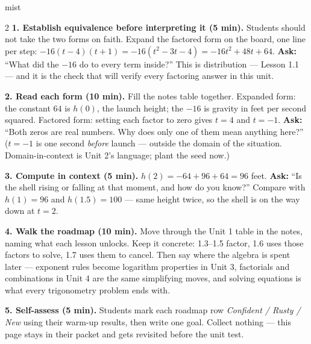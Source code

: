 \documentclass[10pt]{article}
\begin{document}
\boxguard
\begin{skillbox}[Lesson]{mist}
\begin{multicols}{2}
\textbf{1. Establish equivalence before interpreting it (5 min).} Students should not take the
two forms on faith. Expand the factored form on the board, one line per step:
$-16(t-4)(t+1) = -16(t^2-3t-4) = -16t^2+48t+64$. \textbf{Ask:} ``What did the $-16$ do to every
term inside?'' This is distribution --- Lesson 1.1 --- and it is the check that will verify every
factoring answer in this unit.

\textbf{2. Read each form (10 min).} Fill the notes table together. Expanded form: the constant
$64$ is $h(0)$, the launch height; the $-16$ is gravity in feet per second squared. Factored
form: setting each factor to zero gives $t=4$ and $t=-1$. \textbf{Ask:} ``Both zeros are real
numbers. Why does only one of them mean anything here?'' ($t=-1$ is one second \emph{before}
launch --- outside the domain of the situation. Domain-in-context is Unit 2's language; plant
the seed now.)

\textbf{3. Compute in context (5 min).} $h(2) = -64+96+64 = 96$ feet. \textbf{Ask:} ``Is the
shell rising or falling at that moment, and how do you know?'' Compare with $h(1)=96$ and
$h(1.5)=100$ --- same height twice, so the shell is on the way down at $t=2$.

\textbf{4. Walk the roadmap (10 min).} Move through the Unit 1 table in the notes, naming what
each lesson unlocks. Keep it concrete: 1.3--1.5 factor, 1.6 uses those factors to solve, 1.7
uses them to cancel. Then say where the algebra is spent later --- exponent rules become
logarithm properties in Unit 3, factorials and combinations in Unit 4 are the same simplifying
moves, and solving equations is what every trigonometry problem ends with.

\textbf{5. Self-assess (5 min).} Students mark each roadmap row \emph{Confident / Rusty /
New} using their warm-up results, then write one goal. Collect nothing --- this page stays in
their packet and gets revisited before the unit test.
\end{multicols}
\end{skillbox}
\end{document}
